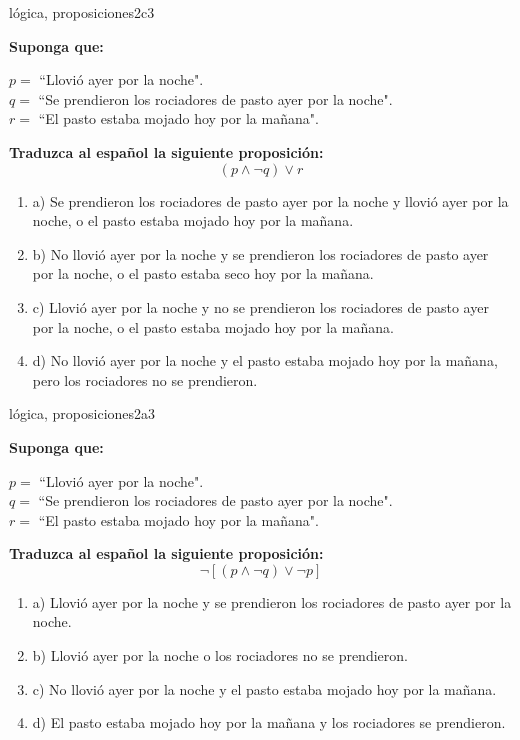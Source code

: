 \documentclass{article}
\begin{document}
\begin{question}{5}{lógica, proposiciones}{2}{c}{3}{
\textbf{Suponga que:} \medskip

\(p = \) ``Llovió ayer por la noche".\\
\(q = \) ``Se prendieron los rociadores de pasto ayer por la noche".\\
\(r = \) ``El pasto estaba mojado hoy por la mañana".\medskip

\textbf{Traduzca al español la siguiente proposición:}
\[
(p \land \neg q) \lor r
\]

\begin{enumerate}
   \item a) Se prendieron los rociadores de pasto ayer por la noche y llovió ayer por la noche, o el pasto estaba mojado hoy por la mañana.
   \item b) No llovió ayer por la noche y se prendieron los rociadores de pasto ayer por la noche, o el pasto estaba seco hoy por la mañana.
   \item c) Llovió ayer por la noche y no se prendieron los rociadores de pasto ayer por la noche, o el pasto estaba mojado hoy por la mañana.
   \item d) No llovió ayer por la noche y el pasto estaba mojado hoy por la mañana, pero los rociadores no se prendieron.
\end{enumerate}
}
\end{question}

\begin{question}{6}{lógica, proposiciones}{2}{a}{3}{
\textbf{Suponga que:} \medskip

\(p = \) ``Llovió ayer por la noche".\\
\(q = \) ``Se prendieron los rociadores de pasto ayer por la noche".\\
\(r = \) ``El pasto estaba mojado hoy por la mañana".\medskip

\textbf{Traduzca al español la siguiente proposición:}
\[
\neg [(p \land \neg q) \lor \neg p]
\]

\begin{enumerate}
   \item a) Llovió ayer por la noche y se prendieron los rociadores de pasto ayer por la noche.  
   \item b) Llovió ayer por la noche o los rociadores no se prendieron.  
   \item c) No llovió ayer por la noche y el pasto estaba mojado hoy por la mañana.  
   \item d) El pasto estaba mojado hoy por la mañana y los rociadores se prendieron.  
\end{enumerate}
}
\end{question}
\end{document}
